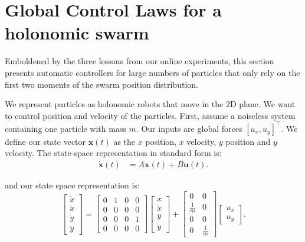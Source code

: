 \section{Global Control Laws for a holonomic swarm}
\label{sec:theory}



Emboldened by the three lessons from our online experiments, this section presents automatic controllers for large numbers of particles that only rely on the first two moments of the swarm position distribution.

We represent particles as holonomic robots that move in the 2D plane. We want to control position and velocity of the particles. 
First, assume a noiseless system containing one particle with mass $m$.
 Our inputs are global forces $[u_x,u_y]^\top$. We define our state vector $\mathbf{x}(t)$ as the $x$ position, $x$ velocity, $y$ position and $y$ velocity.
The state-space representation in standard form is: 
\begin{align}\label{eq:stdform}
\dot{\mathbf{x}}(t)  &=  A \mathbf{x}(t) + B \mathbf{u}(t).
\end{align}

and our state space representation is:
\begin{equation}
\begin{bmatrix}
\dot{x}\\ 
\ddot{x}\\
\dot{y}\\
\ddot{y}
\end{bmatrix} = \begin{bmatrix}
0 & 1 & 0 & 0 \\
0 & 0 & 0 & 0\\
0 & 0 & 0 & 1\\
0 & 0 & 0 & 0
\end{bmatrix}  \begin{bmatrix}
x\\
\dot{x}\\
y\\
\dot{y}
\end{bmatrix} + \begin{bmatrix}
0 & 0 \\
\frac{1}{m} & 0 \\
0 & 0 \\
0 & \frac{1}{m}
\end{bmatrix} 
 \begin{bmatrix}
 u_x\\
 u_y\end{bmatrix}.
\end{equation}

